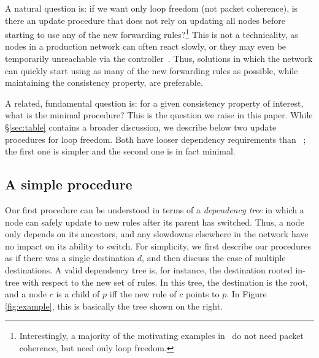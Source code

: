 A natural question is: if we want only loop freedom (not packet coherence), is there an update procedure that does not rely on updating all nodes before starting to use any of the new forwarding rules?\footnote{Interestingly, a majority of the motivating examples in~\cite{safeupdate} do not need packet coherence, but need only loop freedom.}  This is not a technicality, as nodes in a production network can often react slowly, or they may even be temporarily unreachable via the controller~\cite{b4}.  Thus, solutions in which the network can quickly start using as many of the new forwarding rules as possible, while maintaining the consistency property, are preferable.

A related, fundamental question is: for a given consistency property of interest, what is the minimal procedure? This is the question we raise in this paper. While \S\ref{sec:table} contains a broader discussion, we describe below two update procedures for loop freedom. Both have looser dependency requirements than ~\cite{safeupdate}; the first one is simpler and the second one is in fact minimal.



\subsection{A simple procedure}
\label{sec:practical}


Our first procedure can be understood in terms of a {\em dependency tree} in which a node can safely update to new rules after its parent has switched. Thus, a node only depends on its ancestors, and any slowdowns elsewhere in the network have no impact on its ability to switch.
For simplicity, we first describe our procedures as if there was a single destination $d$, and then discuss the case of multiple destinations. A valid dependency tree is, for instance, the destination rooted in-tree with respect to the new set of rules. In this tree, the destination is the root, and a node $c$ is a child of $p$ iff the new rule of $c$ points to $p$. In Figure \ref{fig:example}, this is basically the tree shown on the right.

